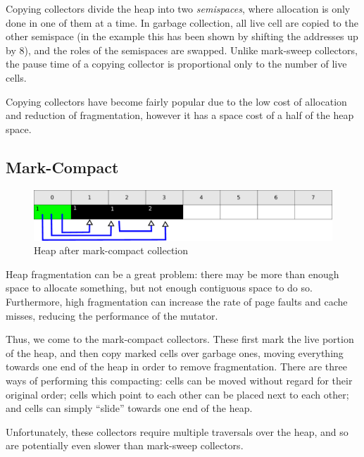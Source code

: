 Copying collectors divide the heap into two \textit{semispaces}, where
allocation is only done in one of them at a time. In garbage
collection, all live \gls{cell} are copied to the other semispace (in
the example this has been shown by shifting the addresses up by 8),
and the roles of the semispaces are swapped\cite{Fenichel69}. Unlike
mark-sweep collectors, the pause time of a copying collector is
proportional only to the number of live \glspl{cell}.

Copying collectors have become fairly popular due to the low cost of
allocation and reduction of fragmentation, however it has a space cost
of a half of the heap space\cite{GarbageCollection}.

\subsection{Mark-Compact}
\label{sec:lit-gc-markcompact}

\begin{figure}[h]
  \centering
  \includegraphics[width=\textwidth]{lit-gc-markcompact}
  \caption{Heap after mark-compact collection}
  \label{fig:lit-gc-markcompact}
\end{figure}

Heap \gls{fragmentation} can be a great problem: there may be more
than enough space to allocate something, but not enough contiguous
space to do so. Furthermore, high fragmentation can increase the rate
of page faults and cache misses, reducing the performance of the
mutator.

Thus, we come to the mark-compact collectors. These first mark the
live portion of the heap, and then copy marked \glspl{cell} over
garbage ones, moving everything towards one end of the heap in order
to remove fragmentation. There are three ways of performing this
compacting: \glspl{cell} can be moved without regard for their
original order; \glspl{cell} which point to each other can be placed
next to each other; and \glspl{cell} can simply ``slide'' towards one
end of the heap.

Unfortunately, these collectors require multiple traversals over the
heap, and so are potentially even slower than mark-sweep
collectors\cite{GarbageCollection}.

